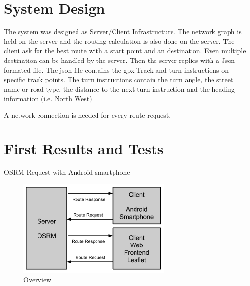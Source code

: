 \documentclass{sig-alternate}
\begin{document}


\section{System Design}
The system was designed as Server/Client Infrastructure. The network graph is held on the server and the routing calculation is also done on the server.  The client ask for the best route with a start point and an destination. Even multiple destination can be handled by the server. Then the server replies with a Json formated file. The json file contains the gpx Track and turn instructions on specific track points. The turn instructions contain the turn angle, the street name or road type, the distance to the next turn instruction and the heading information (i.e. North West) 

A network connection is needed for every route request.

\section{First Results and Tests}

OSRM Request with Android smartphone 

\begin{figure}
\centering
\includegraphics[width=3in]{System-Design2.png}
\caption{Overview}
\end{figure}
\end{document}
